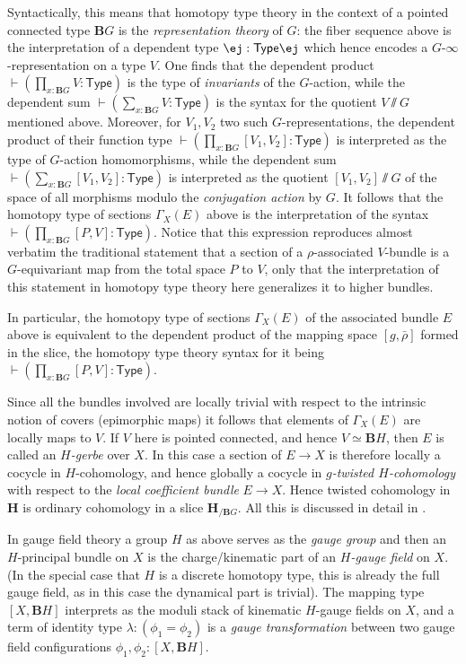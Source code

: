 \documentclass[copyright,12pt]{eptcs}
\makeatletter
\newcommand{\type}{\ensuremath{\mathsf{Type}}\xspace}
\def\jd#1{\@jd#1\ej}
\def\@jd#1|-#2\ej{\@@jd#1,,\;\vdash\;\left(#2\right)}
\def\@@jd#1,{\@ifmtarg{#1}{\let\next=\relax}{\left(#1\right)\let\next=\@@@jd}\next}
\def\@@@jd#1,{\@ifmtarg{#1}{\let\next=\relax}{,\,\left(#1\right)\let\next=\@@@jd}\next}
\makeatother
\begin{document}
Syntactically, this means that homotopy type theory in the context of a pointed connected type
$\mathbf{B}G$ is the \emph{representation theory} of $G$: the fiber sequence above
is the interpretation of a dependent type
$
  \jd{x : \mathbf{B}G |- V : \type}
$
which hence encodes a $G$-$\infty$-representation on a type $V$.
One finds that the dependent product
$
 \vdash( \prod_{x : \mathbf{B}G} V : \type)
$
is the type of \emph{invariants} of the $G$-action, while the dependent sum
$
  \vdash(\sum_{x : \mathbf{B}G} V : \type)
$
is the syntax for the quotient $V\sslash G$ mentioned above. Moreover, for $V_1, V_2$ two
such $G$-representations, the dependent product of their function type
$
  \vdash (\prod_{x : \mathbf{B}G} [V_1, V_2] : \type)
$
is interpreted as the type of $G$-action homomorphisms, while the dependent sum
$
  \vdash (\sum_{x : \mathbf{B}G} [V_1, V_2] : \type)
$
is interpreted
as
the quotient $[V_1, V_2]\sslash G$ of the space of all morphisms modulo
the \emph{conjugation action} by $G$. It follows that the homotopy type of sections
$\Gamma_X(E)$ above is the interpretation of the syntax
$\vdash (\prod_{x : \mathbf{B}G}  [P, V] : \type)$. Notice that this
expression reproduces almost verbatim the traditional statement that a section of a $\rho$-associated
$V$-bundle is a $G$-equivariant map from the total space $P$ to $V$, only that the
interpretation of this statement in homotopy type theory here generalizes it to higher bundles.

In particular, the
homotopy type of sections $\Gamma_X(E)$
of the associated bundle $E$ above is equivalent to the dependent product of the mapping
space $[g, \bar \rho]$ formed in the slice, the
homotopy type theory syntax for it being $\vdash( \prod_{x : \mathbf{B}G} [P, V] : \type)$.

Since all the bundles involved are locally trivial with respect to the intrinsic notion of
covers (epimorphic maps) it follows that
elements of $\Gamma_X(E)$ are locally maps to $V$. If $V$ here is pointed connected,
and hence $V \simeq \mathbf{B}H$, then $E$ is called an \emph{$H$-gerbe} over $X$.
In this case a section of $E \to X$ is therefore locally a cocycle in $H$-cohomology,
and hence globally a cocycle in \emph{$g$-twisted $H$-cohomology} with respect to the
\emph{local coefficient bundle} $E \to X$. Hence twisted cohomology in $\mathbf{H}$
is ordinary cohomology in a slice $\mathbf{H}_{/\mathbf{B}G}$. All this is discussed in
detail in \cite{NSS}.

In gauge field theory a group $H$ as above serves as the \emph{gauge group} and then
an $H$-principal bundle on $X$ is the charge/kinematic part of an \emph{$H$-gauge field} on $X$.
(In the special case that $H$ is a discrete homotopy type, this is already the full
gauge field, as in this case the dynamical part is trivial).
The mapping type $[X, \mathbf{B}H]$ interprets as the moduli stack of kinematic
$H$-gauge fields on $X$, and a term of identity type $\lambda :  (\phi_1 = \phi_2)$
is a \emph{gauge transformation} between two gauge field configurations $\phi_1, \phi_2: [X, \mathbf{B}H]$.
\end{document}
